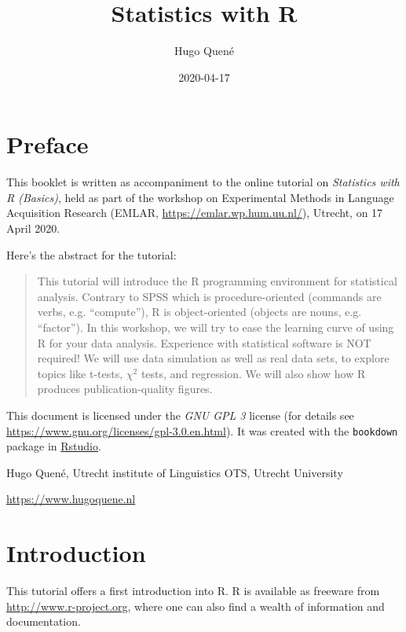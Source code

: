 \documentclass[]{book}
\title{Statistics with R}
\author{Hugo Quené}
\date{2020-04-17}
\begin{document}
\maketitle

{
\setcounter{tocdepth}{1}
\tableofcontents
}
\hypertarget{preface}{%
\chapter*{Preface}\label{preface}}

This booklet is written as accompaniment to the online tutorial on \emph{Statistics with R (Basics)}, held as part of the workshop on Experimental Methods in Language Acquisition Research (EMLAR, \url{https://emlar.wp.hum.uu.nl/}), Utrecht, on 17 April 2020.

Here's the abstract for the tutorial:

\begin{quote}
This tutorial will introduce the R programming environment for statistical analysis. Contrary to SPSS which is procedure-oriented (commands are verbs, e.g. ``compute''), R is object-oriented (objects are nouns, e.g. ``factor''). In this workshop, we will try to ease the learning curve of using R for your data analysis. Experience with statistical software is NOT required! We will use data simulation as well as real data sets, to explore topics like t-tests, \(\chi^2\) tests, and regression. We will also show how R produces publication-quality figures.
\end{quote}

This document is licensed under the \emph{GNU GPL 3} license (for details see
\url{https://www.gnu.org/licenses/gpl-3.0.en.html}). It was created with the \texttt{bookdown} package \citep{R-bookdown} in \href{https://www.rstudio.com}{Rstudio}.

Hugo Quené, Utrecht institute of Linguistics OTS, Utrecht University

\url{https://www.hugoquene.nl}

\hypertarget{ch:introduction}{%
\chapter{Introduction}\label{ch:introduction}}

This tutorial offers a first introduction into R.
R is available as freeware from
\url{http://www.r-project.org}, where one can also find a wealth of
information and documentation.
\end{document}
